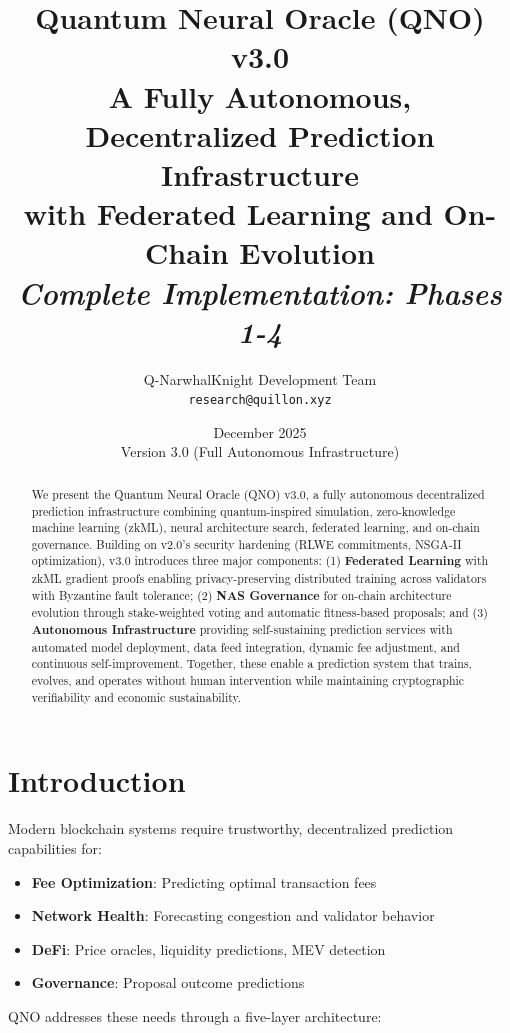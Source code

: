 \documentclass[11pt,a4paper]{article}
\title{
    \vspace{-2cm}
    \textbf{Quantum Neural Oracle (QNO) v3.0} \\
    \large A Fully Autonomous, Decentralized Prediction Infrastructure \\
    with Federated Learning and On-Chain Evolution \\
    \vspace{0.5cm}
    \normalsize \textit{Complete Implementation: Phases 1-4}
}
\author{
    Q-NarwhalKnight Development Team \\
    \texttt{research@quillon.xyz}
}
\date{December 2025 \\ Version 3.0 (Full Autonomous Infrastructure)}
\begin{document}
\maketitle

\begin{abstract}
We present the Quantum Neural Oracle (QNO) v3.0, a fully autonomous decentralized prediction infrastructure combining quantum-inspired simulation, zero-knowledge machine learning (zkML), neural architecture search, federated learning, and on-chain governance. Building on v2.0's security hardening (RLWE commitments, NSGA-II optimization), v3.0 introduces three major components: (1) \textbf{Federated Learning} with zkML gradient proofs enabling privacy-preserving distributed training across validators with Byzantine fault tolerance; (2) \textbf{NAS Governance} for on-chain architecture evolution through stake-weighted voting and automatic fitness-based proposals; and (3) \textbf{Autonomous Infrastructure} providing self-sustaining prediction services with automated model deployment, data feed integration, dynamic fee adjustment, and continuous self-improvement. Together, these enable a prediction system that trains, evolves, and operates without human intervention while maintaining cryptographic verifiability and economic sustainability.
\end{abstract}

\tableofcontents
\newpage

\section{Introduction}

Modern blockchain systems require trustworthy, decentralized prediction capabilities for:
\begin{itemize}
    \item \textbf{Fee Optimization}: Predicting optimal transaction fees
    \item \textbf{Network Health}: Forecasting congestion and validator behavior
    \item \textbf{DeFi}: Price oracles, liquidity predictions, MEV detection
    \item \textbf{Governance}: Proposal outcome predictions
\end{itemize}

QNO addresses these needs through a five-layer architecture:
\end{document}
